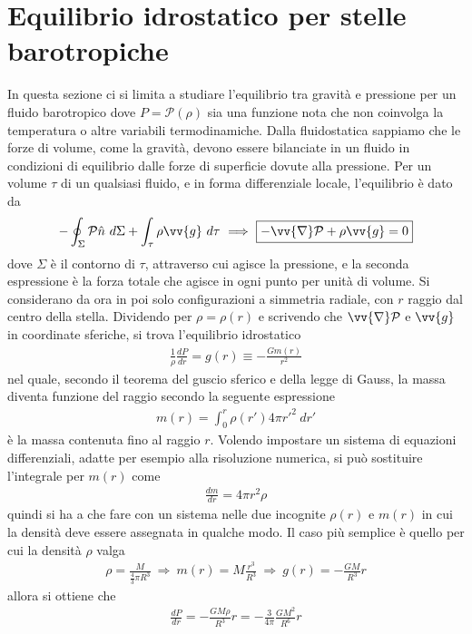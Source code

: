 \documentclass[a4paper, oneside]{book}
\begin{document}
\section{Equilibrio idrostatico per stelle barotropiche}
In questa sezione ci si limita a studiare l'equilibrio tra gravità e pressione per un fluido 
barotropico dove $P = \mathcal{P}(\rho)$ sia una funzione nota che non coinvolga la temperatura o altre variabili termodinamiche. 
Dalla fluidostatica sappiamo che le forze di volume, come la gravità, devono essere bilanciate in un fluido in condizioni 
di equilibrio dalle forze di superficie dovute alla pressione. Per un volume $\tau$ di un qualsiasi fluido, e in forma differenziale 
locale, l'equilibrio è dato da
\begin{align}
    - \oint_\Sigma \mathcal{P} \hat{n} \ d\Sigma + \int_{\tau} \rho \vv{g} \ d\tau \ \Longrightarrow \ \boxed{- \vv{\nabla} \mathcal{P} + \rho \vv{g} = 0}       
\end{align}
dove $\Sigma$ è il contorno di $\tau$, attraverso cui agisce la pressione, e la seconda espressione è la forza totale che agisce in ogni 
punto per unità di volume. Si considerano da ora in poi solo configurazioni a simmetria radiale, con $r$ raggio dal centro della stella. 
Dividendo per $\rho = \rho(r)$ e scrivendo che $\vv{\nabla} \mathcal{P}$ e $\vv{g}$ in coordinate sferiche, si trova 
l'equilibrio idrostatico
\begin{align}
    \boxed{\frac{1}{\rho} \frac{dP}{dr} = g(r) \equiv - \frac{Gm(r)}{r^{2}}}
\end{align}  
nel quale, secondo il teorema del guscio sferico e della legge di Gauss, la massa
diventa funzione del raggio secondo la seguente espressione
\begin{align}
    m(r) = \int_{0}^{r} \rho(r') 4\pi r'^{2} \ dr' 
\end{align}
è la massa contenuta fino al raggio $r$. Volendo impostare un sistema di equazioni differenziali, adatte 
per esempio alla risoluzione numerica, si può sostituire l'integrale per $m(r)$ come 
\begin{gather*}
    \frac{dm}{dr} = 4\pi r^{2}\rho
\end{gather*}
quindi si ha a che fare con un sistema nelle due incognite $\rho(r)$ e $m(r)$ in cui la densità
deve essere assegnata in qualche modo. Il caso più semplice è quello per cui la densità $\rho$ valga
\begin{gather*}
    \rho = \frac{M}{\frac{4}{3}\pi R^{3}} \ \Longrightarrow \ m(r) = M\frac{r^{3}}{R^{3}} \ \Longrightarrow \ g(r) = - \frac{GM}{R^{3}}r
\end{gather*}
allora si ottiene che
\begin{gather*}
    \frac{dP}{dr} = - \frac{GM\rho}{R^{3}}r = - \frac{3}{4\pi} \frac{GM^{2}}{R^{6}}r
\end{gather*}
\end{document}

